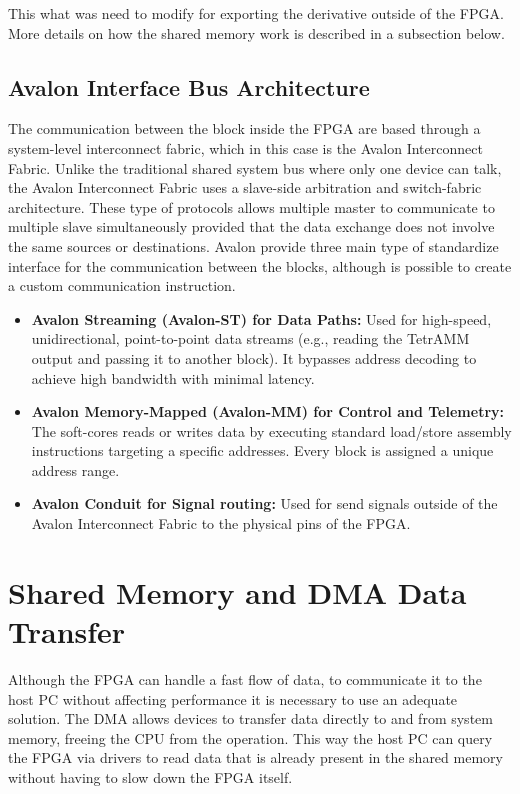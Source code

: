 This what was need to modify for exporting the derivative outside of the FPGA. More details on how the shared memory work is described in a subsection below.

\subsection{Avalon Interface Bus Architecture}
The communication between the block inside the FPGA are based through a system-level interconnect fabric, which in this case is the Avalon Interconnect Fabric.
Unlike the traditional shared system bus where only one device can talk, the Avalon Interconnect Fabric uses a slave-side arbitration and switch-fabric architecture.
These type of protocols allows multiple master to communicate to multiple slave simultaneously provided that the data exchange does not involve the same sources or destinations.
Avalon provide three main type of standardize interface for the communication between the blocks, although is possible to create a custom communication instruction.
\begin{itemize}
    \item \textbf{Avalon Streaming (Avalon-ST) for Data Paths:} Used for high-speed, unidirectional, point-to-point data streams (e.g., reading the TetrAMM output and passing it to another block). It bypasses address decoding to achieve high bandwidth with minimal latency.
    \item \textbf{Avalon Memory-Mapped (Avalon-MM) for Control and Telemetry:} The soft-cores reads or writes data by executing standard load/store assembly instructions targeting a specific addresses. Every block is assigned a unique address range. 
    \item \textbf{Avalon Conduit for Signal routing:} Used for send signals outside of the Avalon Interconnect Fabric to the physical pins of the FPGA.
\end{itemize}

\section{Shared Memory and DMA Data Transfer}

Although the FPGA can handle a fast flow of data, to communicate it to the host PC without affecting performance it is necessary to use an adequate solution.
The DMA allows devices to transfer data directly to and from system memory, freeing the CPU from the operation.
This way the host PC can query the FPGA via drivers to read data that is already present in the shared memory without having to slow down the FPGA itself.

